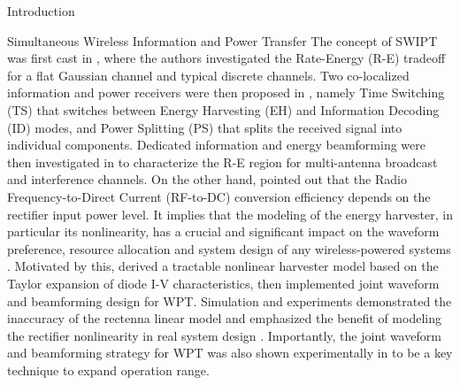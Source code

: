 \documentclass[journal]{IEEEtran}
\begin{document}
\begin{section}{Introduction}
\begin{subsection}{Simultaneous Wireless Information and Power Transfer}
			The concept of SWIPT was first cast in \cite{Varshney2008}, where the authors investigated the Rate-Energy (R-E) tradeoff for a flat Gaussian channel and typical discrete channels. Two co-localized information and power receivers were then proposed in \cite{Zhou2013}, namely Time Switching (TS) that switches between Energy Harvesting (EH) and Information Decoding (ID) modes, and Power Splitting (PS) that splits the received signal into individual components. Dedicated information and energy beamforming were then investigated in \cite{Zhang2013,Park2014} to characterize the R-E region for multi-antenna broadcast and interference channels.
			On the other hand, \cite{Trotter2009} pointed out that the Radio Frequency-to-Direct Current (RF-to-DC) conversion efficiency depends on the rectifier input power level. It implies that the modeling of the energy harvester, in particular its nonlinearity, has a crucial and significant impact on the waveform preference, resource allocation and system design of any wireless-powered systems \cite{Trotter2009,Clerckx2018,Clerckx2019}. Motivated by this, \cite{Clerckx2016a} derived a tractable nonlinear harvester model based on the Taylor expansion of diode I-V characteristics, then implemented joint waveform and beamforming design for WPT. Simulation and experiments demonstrated the inaccuracy of the rectenna linear model and emphasized the benefit of modeling the rectifier nonlinearity in real system design \cite{Kim2019,Kim2019a}. Importantly, the joint waveform and beamforming strategy for WPT was also shown experimentally in \cite{Kim2020} to be a key technique to expand operation range. %

\end{subsection}
\end{section}
\end{document}
